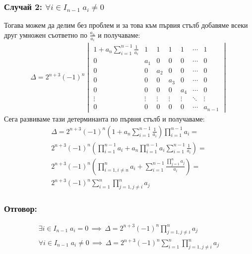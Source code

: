 \documentclass[a4paper, 12pt, oneside]{article}
\begin{document}
\subsubsection*{Случай 2: \(\forall i \in I_{n - 1} \; a_i \neq 0\)}
Тогава можем да делим без проблем и за това към първия стълб добавяме всеки друг умножен съответно по \(\displaystyle\frac{a_n}{a_i}\)
и получаваме:
\begin{align*}
\Delta = 2^{n + 3}(-1)^n\begin{vmatrix}
    1 + a_n\displaystyle\sum_{i = 1}^{n - 1}\displaystyle\frac{1}{a_i} & 1 & 1 & 1 & 1 & \cdots & 1 \\
    0 & a_1 & 0 & 0 & 0 & \cdots & 0 \\
    0 & 0 & a_2 & 0 & 0 & \cdots & 0 \\
    0 & 0 & 0 & a_3 & 0 & \cdots & 0 \\
    0 & 0 & 0 & 0 & a_4 & \cdots & 0 \\
    \vdots & \vdots & \vdots & \vdots & \vdots & \ddots & \vdots \\
    0 & 0 & 0 & 0 & 0 & \cdots & a_{n - 1}
\end{vmatrix}
\end{align*}
Сега развиваме тази детерминанта по първия стълб и получаваме:
\begin{align*}
\Delta = 2^{n + 3}(-1)^n\left(1 + a_n\displaystyle\sum_{i = 1}^{n - 1}\displaystyle\frac{1}{a_i}\right)\displaystyle\prod_{i = 1}^{n - 1}a_i = \\
2^{n + 3}(-1)^n\left(\displaystyle\prod_{i = 1}^{n - 1}a_i + a_n\displaystyle\prod_{i = 1}^{n - 1}a_i\displaystyle\sum_{i = 1}^{n - 1}\displaystyle\frac{1}{a_i}\right) = \\
2^{n + 3}(-1)^n\left(\displaystyle\prod_{i = 1, i \neq n}^n a_i + \displaystyle\sum_{i = 1}^{n - 1}\displaystyle\frac{\displaystyle\prod_{j = 1}^n a_j}{a_i}\right) = \\
2^{n + 3}(-1)^n\displaystyle\sum_{i = 1}^n\displaystyle\prod_{j = 1, j \neq i}^n a_j
\end{align*}
\subsubsection*{Отговор:}
\begin{align*}
    \exists i \in I_{n - 1} \; a_i = 0 \, \implies \, \Delta = 2^{n + 3}(-1)^n\displaystyle\prod_{j = 1, j \neq i}^n a_j \\
    \forall i \in I_{n - 1} \; a_i \neq 0 \, \implies \, \Delta = 2^{n + 3}(-1)^n\displaystyle\sum_{i = 1}^n\displaystyle\prod_{j = 1, j \neq i}^n a_j
\end{align*}
\end{document}
